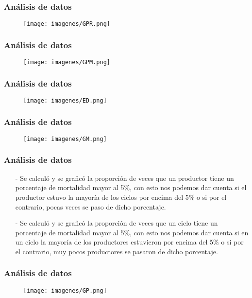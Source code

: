 \documentclass[11pt]{beamer}
\begin{document}
\begin{frame}
\frametitle{Análisis de datos}
\begin{figure}[!h]
        \texttt{[image: imagenes/GPR.png]}
        \label{figura1}
\end{figure}
\end{frame}

\begin{frame}
\frametitle{Análisis de datos}
\begin{figure}[!h]
        \texttt{[image: imagenes/GPM.png]}
        \label{figura1}
\end{figure}
\end{frame}

\begin{frame}
\frametitle{Análisis de datos}
\begin{figure}[!h]
        \texttt{[image: imagenes/ED.png]}
        \label{figura1}
\end{figure}
\end{frame}

\begin{frame}
\frametitle{Análisis de datos}
\begin{figure}[!h]
        \texttt{[image: imagenes/GM.png]}
        \label{figura1}
\end{figure}
\end{frame}

\begin{frame}
\frametitle{Análisis de datos}
\begin{itemize}
\justifying
\item[-]Se calculó y se graficó la proporción de veces que un productor tiene un porcentaje de mortalidad mayor al 5\%, con esto nos podemos dar cuenta si el productor estuvo la mayoría de los ciclos por encima del 5\% o si por el contrario, pocas veces se paso de dicho porcentaje.
\item[-]Se calculó y se graficó la proporción de veces que un ciclo tiene un porcentaje de mortalidad mayor al 5\%, con esto nos podemos dar cuenta si en un ciclo la mayoría de los productores estuvieron por encima del 5\% o si por el contrario, muy pocos productores se pasaron de dicho porcentaje.
\end{itemize}
\end{frame}

\begin{frame}
\frametitle{Análisis de datos}
\begin{figure}[!h]
        \texttt{[image: imagenes/GP.png]}
        \label{figura1}
\end{figure}
\end{frame}
\end{document}
